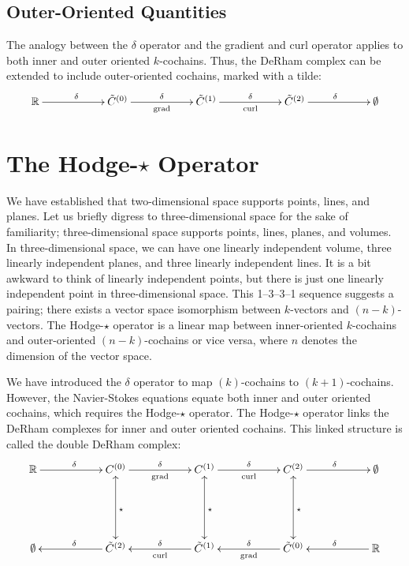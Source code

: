 \subsection{Outer-Oriented Quantities}

The analogy between the $\delta$ operator and the gradient and curl operator applies to both inner and outer oriented $k$-cochains. Thus, the DeRham complex can be extended to include outer-oriented cochains, marked with a tilde:
\begin{equation}
    \begin{gathered}
        \xymatrix@C=13ex{
            \mathbb{R} \ar[r]^{\delta} & \tilde{C}^{(0)} \ar[r]^{\delta}_{\text{grad}} & \tilde{C}^{(1)} \ar[r]^{\delta}_{\text{curl}} & \tilde{C}^{(2)} \ar[r]^{\delta} & \emptyset
        }
    \end{gathered}
\end{equation}

\section{The Hodge-$\star$ Operator}

We have established that two-dimensional space supports points, lines, and planes. Let us briefly digress to three-dimensional space for the sake of familiarity; three-dimensional space supports points, lines, planes, and volumes. In three-dimensional space, we can have one linearly independent volume, three linearly independent planes, and three linearly independent lines. It is a bit awkward to think of linearly independent points, but there is just one linearly independent point in three-dimensional space. This 1--3--3--1 sequence suggests a pairing; there exists a vector space isomorphism between $k$-vectors and $(n-k)$-vectors. The Hodge-$\star$ operator is a linear map between inner-oriented $k$-cochains and outer-oriented $(n-k)$-cochains or vice versa, where $n$ denotes the dimension of the vector space.

We have introduced the $\delta$ operator to map $(k)$-cochains to $(k+1)$-cochains. However, the Navier-Stokes equations equate both inner and outer oriented cochains, which requires the Hodge-$\star$ operator. The Hodge-$\star$ operator links the DeRham complexes for inner and outer oriented cochains. This linked structure is called the double DeRham complex:
\begin{equation}
    \begin{gathered}
        \xymatrix@=13ex{
            \mathbb{R} \ar[r]^{\delta} & C^{(0)} \ar[r]^{\delta}_{\text{grad}} \ar@{<->}[d]^{\star} & C^{(1)} \ar[r]^{\delta}_{\text{curl}} \ar@{<->}[d]^{\star} & C^{(2)} \ar@{<->}[d]^{\star} \ar[r]^{\delta} & \emptyset \\
            \emptyset & \tilde{C}^{(2)} \ar[l]_{\delta} & \tilde{C}^{(1)} \ar[l]_{\delta}^{\text{curl}} & \tilde{C}^{(0)} \ar[l]_{\delta}^{\text{grad}} & \mathbb{R} \ar[l]_{\delta}
        }
    \end{gathered}
    \label{eq:doubleDeRham}
\end{equation}

